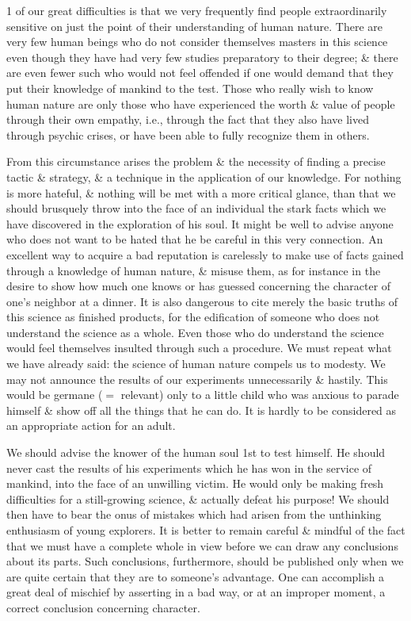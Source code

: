 \documentclass{article}
\begin{document}
1 of our great difficulties is that we very frequently find people extraordinarily sensitive on just the point of their understanding of human nature. There are very few human beings who do not consider themselves masters in this science even though they have had very few studies preparatory to their degree; \& there are even fewer such who would not feel offended if one would demand that they put their knowledge of mankind to the test. Those who really wish to know human nature are only those who have experienced the worth \& value of people through their own empathy, i.e., through the fact that they also have lived through psychic crises, or have been able to fully recognize them in others.

From this circumstance arises the problem \& the necessity of finding a precise tactic \& strategy, \& a technique in the application of our knowledge. For nothing is more hateful, \& nothing will be met with a more critical glance, than that we should brusquely throw into the face of an individual the stark facts which we have discovered in the exploration of his soul. It might be well to advise anyone who does not want to be hated that he be careful in this very connection. An excellent way to acquire a bad reputation is carelessly to make use of facts gained through a knowledge of human nature, \& misuse them, as for instance in the desire to show how much one knows or has guessed concerning the character of one's neighbor at a dinner. It is also dangerous to cite merely the basic truths of this science as finished products, for the edification of someone who does not understand the science as a whole. Even those who do understand the science would feel themselves insulted through such a procedure. We must repeat what we have already said: the science of human nature compels us to modesty. We may not announce the results of our experiments unnecessarily \& hastily. This would be germane ($=$ relevant) only to a little child who was anxious to parade himself \& show off all the things that he can do. It is hardly to be considered as an appropriate action for an adult.

We should advise the knower of the human soul 1st to test himself. He should never cast the results of his experiments which he has won in the service of mankind, into the face of an unwilling victim. He would only be making fresh difficulties for a still-growing science, \& actually defeat his purpose! We should then have to bear the onus of mistakes which had arisen from the unthinking enthusiasm of young explorers. It is better to remain careful \& mindful of the fact that we must have a complete whole in view before we can draw any conclusions about its parts. Such conclusions, furthermore, should be published only when we are quite certain that they are to someone's advantage. One can accomplish a great deal of mischief by asserting in a bad way, or at an improper moment, a correct conclusion concerning character.
\end{document}
